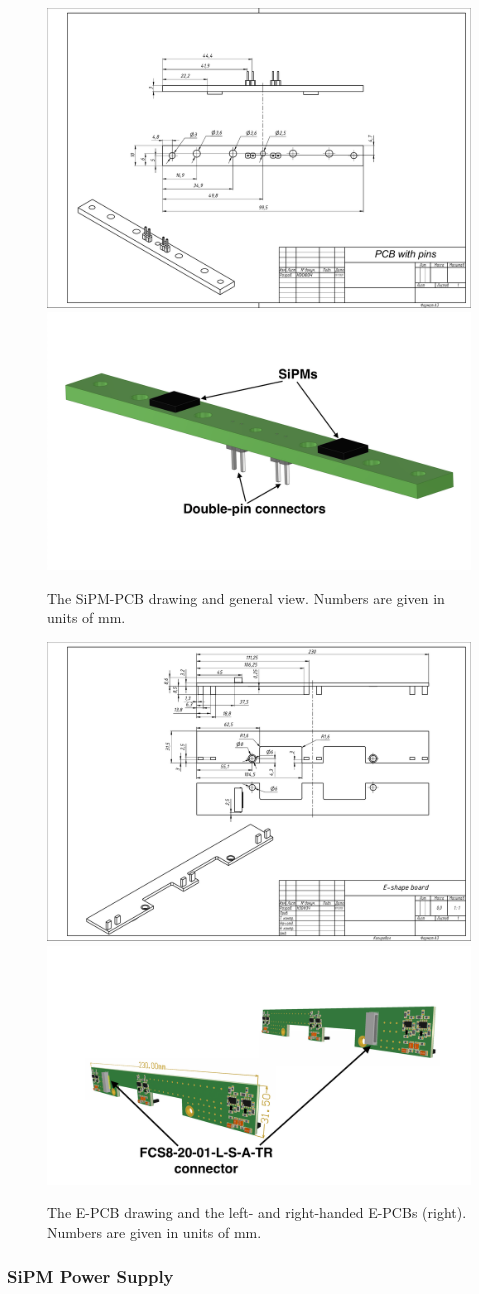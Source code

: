 \begin{figure}[htbp]
\centering 
\includegraphics[width=0.47\linewidth]{graphics/lartpc/Light/SiPM_PCBdrawing.pdf}
\qquad
\includegraphics[width=0.47\linewidth]{graphics/lartpc/Light/SiPMpcb.png}
\caption{\label{fig:pcb} The SiPM-PCB drawing and general view. Numbers are given in units of mm.}
\end{figure}

\begin{figure}[htbp]
\centering 
\includegraphics[width=0.47\linewidth]{graphics/lartpc/Light/Eboard.pdf}
\qquad
\includegraphics[width=0.47\linewidth]{graphics/lartpc/Light/EE.png}
\caption{\label{fig:e-pcb} The E-PCB drawing and the left- and right-handed E-PCBs (right). Numbers are given in units of mm.}
\end{figure}

\subsubsection{SiPM Power Supply}

